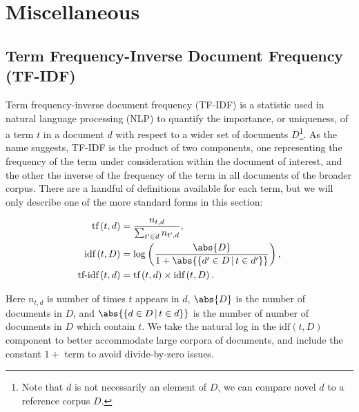 \chapter{Miscellaneous}
\label{chap:misc}

\section{Term Frequency-Inverse Document Frequency (TF-IDF)}
\label{misc:tfidf}

Term frequency-inverse document frequency (TF-IDF) is a statistic
used in natural language processing (NLP) to quantify
the importance, or uniqueness, of a term $t$ in a document $d$
with respect to a wider set of documents $D$\footnote{Note that $d$ is not necessarily an element of $D$, we can compare novel $d$ to a reference corpus $D$.}.
As the name suggests, TF-IDF is the product of two components,
one representing the frequency of the term under consideration within the document of interest,
and the other the inverse of the frequency of the term in all documents of the broader corpus.
There are a handful of definitions available for each term, but we will only describe
one of the more standard forms in this section:

\begin{subequations}\label{eq:unsupervised:tfidf}
\begin{align}
\text{tf}\left(t,d\right) &= \frac{n_{t,d}}{\sum_{t' \in d} n_{t',d}}, \label{eq:unsupervised:tfidf:tf} \\
\text{idf}\left(t,D\right) &= \log\left(\frac{\abs{D}}{1 + \abs{\left\{d' \in D \, | \, t \in d'\right\}}}\right), \label{eq:unsupervised:tfidf:idf} \\
\text{tf-idf}\left(t,d\right) &= \text{tf}\left(t,d\right) \times \text{idf}\left(t,D\right). \label{eq:unsupervised:tfidf:tfidf}
\end{align}
\end{subequations}

\noindent Here $n_{t,d}$ is number of times $t$ appears in $d$,
$\abs{D}$ is the number of documents in $D$,
and $\abs{\left\{d \in D \, | \, t \in d\right\}}$ is the number of number of documents in $D$ which contain $t$.
We take the natural log in the $\text{idf}\left(t,D\right)$ component to better accommodate large corpora of documents,
and include the constant $1+$ term to avoid divide-by-zero issues.

